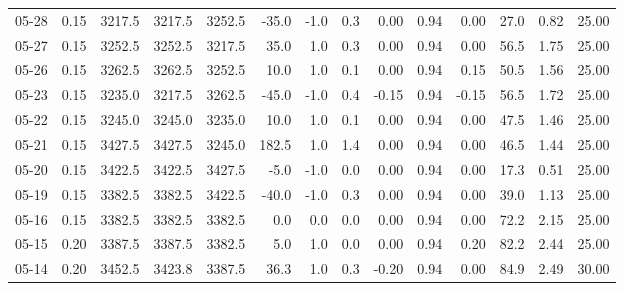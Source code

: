 \begin{threeparttable}
{\begin{tabular}{lrrrrrrrrrrrrr}
  05-28 &     0.15 & 3217.5 & 3217.5 & 3252.5 &      -35.0 &                     -1.0 &                 0.3 &       0.00 &      0.94 &           0.00 &             27.0 &            0.82 &                  25.00 \\
  05-27 &     0.15 & 3252.5 & 3252.5 & 3217.5 &       35.0 &                      1.0 &                 0.3 &       0.00 &      0.94 &           0.00 &             56.5 &            1.75 &                  25.00 \\
  05-26 &     0.15 & 3262.5 & 3262.5 & 3252.5 &       10.0 &                      1.0 &                 0.1 &       0.00 &      0.94 &           0.15 &             50.5 &            1.56 &                  25.00 \\
  05-23 &     0.15 & 3235.0 & 3217.5 & 3262.5 &      -45.0 &                     -1.0 &                 0.4 &      -0.15 &      0.94 &          -0.15 &             56.5 &            1.72 &                  25.00 \\
  05-22 &     0.15 & 3245.0 & 3245.0 & 3235.0 &       10.0 &                      1.0 &                 0.1 &       0.00 &      0.94 &           0.00 &             47.5 &            1.46 &                  25.00 \\
  05-21 &     0.15 & 3427.5 & 3427.5 & 3245.0 &      182.5 &                      1.0 &                 1.4 &       0.00 &      0.94 &           0.00 &             46.5 &            1.44 &                  25.00 \\
  05-20 &     0.15 & 3422.5 & 3422.5 & 3427.5 &       -5.0 &                     -1.0 &                 0.0 &       0.00 &      0.94 &           0.00 &             17.3 &            0.51 &                  25.00 \\
  05-19 &     0.15 & 3382.5 & 3382.5 & 3422.5 &      -40.0 &                     -1.0 &                 0.3 &       0.00 &      0.94 &           0.00 &             39.0 &            1.13 &                  25.00 \\
  05-16 &     0.15 & 3382.5 & 3382.5 & 3382.5 &        0.0 &                      0.0 &                 0.0 &       0.00 &      0.94 &           0.00 &             72.2 &            2.15 &                  25.00 \\
  05-15 &     0.20 & 3387.5 & 3387.5 & 3382.5 &        5.0 &                      1.0 &                 0.0 &       0.00 &      0.94 &           0.20 &             82.2 &            2.44 &                  25.00 \\
  05-14 &     0.20 & 3452.5 & 3423.8 & 3387.5 &       36.3 &                      1.0 &                 0.3 &      -0.20 &      0.94 &           0.00 &             84.9 &            2.49 &                  30.00 \\

\end{tabular}}
\end{threeparttable}
